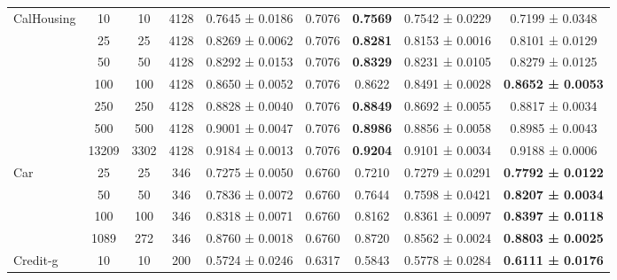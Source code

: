 \begin{table}
{\begin{tabular}[H]{@{}lcccccccc@{}}
\multirow{7}{*}{CalHousing}   & 10    & 10   & 4128 & 0.7645 ± 0.0186      & 0.7076               & \textbf{0.7569} & 0.7542 ± 0.0229          & 0.7199 ± 0.0348          \\
                              & 25    & 25   & 4128 & 0.8269 ± 0.0062      & 0.7076               & \textbf{0.8281} & 0.8153 ± 0.0016          & 0.8101 ± 0.0129          \\
                              & 50    & 50   & 4128 & 0.8292 ± 0.0153      & 0.7076               & \textbf{0.8329} & 0.8231 ± 0.0105          & 0.8279 ± 0.0125          \\
                              & 100   & 100  & 4128 & 0.8650 ± 0.0052      & 0.7076               & 0.8622          & 0.8491 ± 0.0028          & \textbf{0.8652 ± 0.0053} \\
                              & 250   & 250  & 4128 & 0.8828 ± 0.0040      & 0.7076               & \textbf{0.8849} & 0.8692 ± 0.0055          & 0.8817 ± 0.0034          \\
                              & 500   & 500  & 4128 & 0.9001 ± 0.0047      & 0.7076               & \textbf{0.8986} & 0.8856 ± 0.0058          & 0.8985 ± 0.0043          \\
                              & 13209 & 3302 & 4128 & 0.9184 ± 0.0013      & 0.7076               & \textbf{0.9204} & 0.9101 ± 0.0034          & 0.9188 ± 0.0006          \\
                              \midrule
\multirow{4}{*}{Car}          & 25    & 25   & 346  & 0.7275 ± 0.0050      & 0.6760               & 0.7210          & 0.7279 ± 0.0291          & \textbf{0.7792 ± 0.0122} \\
                              & 50    & 50   & 346  & 0.7836 ± 0.0072      & 0.6760               & 0.7644          & 0.7598 ± 0.0421          & \textbf{0.8207 ± 0.0034} \\
                              & 100   & 100  & 346  & 0.8318 ± 0.0071      & 0.6760               & 0.8162          & 0.8361 ± 0.0097          & \textbf{0.8397 ± 0.0118} \\
                              & 1089  & 272  & 346  & 0.8760 ± 0.0018      & 0.6760               & 0.8720          & 0.8562 ± 0.0024          & \textbf{0.8803 ± 0.0025} \\
                              \midrule
\multirow{6}{*}{Credit-g}     & 10    & 10   & 200  & 0.5724 ± 0.0246      & 0.6317               & 0.5843          & 0.5778 ± 0.0284          & \textbf{0.6111 ± 0.0176} \\

\end{tabular}}
\end{table}
